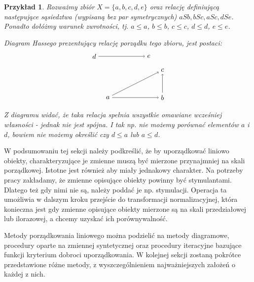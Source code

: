 \documentclass[12pt,a4paper]{report}
\newtheorem{example}{Przykład}
\begin{document}
\begin{example}
Rozważmy zbiór $X = \{a,b,c,d,e \}$ oraz relację definiującą następujące sąsiedztwa (wypisaną bez par symetrycznych) $aSb, bSc, aSc, dSe$. Ponadto dołóżmy warunek zwrotności, tj. $a \leq a$, $b \leq b$, $c \leq c$, $d \leq d$, $e \leq e$. 

Diagram Hassego prezentujący relację porządku tego zbioru, jest postaci:
$$
\begin{tikzpicture}[scale=.7]
  \node (a) at (-2,0) {$a$};
  \node (b) at (2,0) {$b$};
  \node (c) at (2,2) {$c$};
 \node (e) at (1,3) {$e$};
 \node (d) at (-3,3) {$d$};
	\draw [->] (d)--(e);
	\draw [->] (a)--(b);
	\draw [->] (a)--(c);
	\draw [->] (b)--(c);
\end{tikzpicture}
$$
Z diagramu widać, że taka relacja spełnia wszystkie omawiane wcześniej własności - jednak nie jest spójna. I tak np. nie możemy porównać elementów $a$ i $d$, bowiem nie możemy określić czy  $d \leq a$ lub $a \leq d$.
\end{example}



W podsumowaniu tej sekcji należy podkreślić, że by uporządkować liniowo obiekty, charakteryzujące je zmienne muszą być mierzone przynajmniej na skali porządkowej. Istotne jest również aby miały jednakowy charakter. Na potrzeby pracy zakładamy, że zmienne opisujące obiekty powinny być stymulantami. Dlatego też gdy nimi nie są, należy poddać je np. stymulacji. Operacja ta umożliwia w dalszym kroku przejście do transformacji normalizacyjnej, która konieczna jest gdy zmienne opisujące obiekty mierzone są na skali przedziałowej lub ilorazowej, a chcemy uzyskać ich porównywalność.

Metody porządkowania liniowego można podzielić na metody diagramowe, procedury oparte na zmiennej syntetycznej oraz procedury iteracyjne bazujące funkcji kryterium dobroci uporządkowania. %
W kolejnej sekcji zostaną pokrótce przedstawione różne metody, z wyszczególnieniem najważniejszych założeń o każdej z nich.
\end{document}
